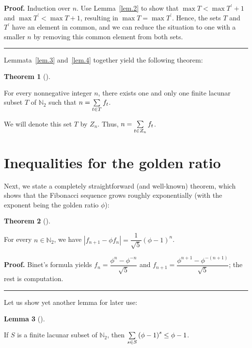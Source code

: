 \documentclass[numbers=enddot,12pt,final,onecolumn,notitlepage]{scrartcl}%
\numberwithin{exer}{section}
\theoremstyle{definition}
\newtheorem{theo}{Theorem}[section]
\newenvironment{theorem}[1][]
{\begin{theo}[#1]\begin{leftbar}}
{\end{leftbar}\end{theo}}
\newtheorem{lem}[theo]{Lemma}
\newenvironment{lemma}[1][]
{\begin{lem}[#1]\begin{leftbar}}
{\end{leftbar}\end{lem}}
\newenvironment{proof}[1][Proof]{\noindent\textbf{#1.} }{\ \rule{0.5em}{0.5em}}
\let\sumnonlimits\sum
\renewcommand{\sum}{\sumnonlimits\limits}
\begin{document}
\begin{proof}
Induction over $n$. Use Lemma~\ref{lem.2} to show that $\max T<\max T^{\prime
}+1$ and $\max T^{\prime}<\max T+1$, resulting in $\max T=\max T^{\prime}$.
Hence, the sets $T$ and $T^{\prime}$ have an element in common, and we can
reduce the situation to one with a smaller $n$ by removing this common element
from both sets.
\end{proof}

Lemmata~\ref{lem.3} and~\ref{lem.4} together yield the following theorem:

\begin{theorem}
[Zeckendorf theorem]\label{thm.5} For every nonnegative integer $n$, there
exists one and only one finite lacunar subset $T$ of $\mathbb{N}_{2}$ such
that $n=\sum\limits_{t\in T}f_{t}$.

We will denote this set $T$ by $Z_{n}$. Thus, $n=\sum\limits_{t\in Z_{n}}%
f_{t}$.
\end{theorem}

\section{Inequalities for the golden ratio}

Next, we state a completely straightforward (and well-known) theorem, which
shows that the Fibonacci sequence grows roughly exponentially (with the
exponent being the golden ratio $\phi$):

\begin{theorem}
\label{thm.6} For every $n\in\mathbb{N}_{2}$, we have $\left\vert f_{n+1}-\phi
f_{n}\right\vert =\dfrac{1}{\sqrt{5}}\left(  \phi-1\right)  ^{n}$.
\end{theorem}

\begin{proof}
Binet's formula yields $f_{n}=\dfrac{\phi^{n}-\phi^{-n}}{\sqrt{5}}$ and
$f_{n+1}=\dfrac{\phi^{n+1}-\phi^{-\left(  n+1\right)  }}{\sqrt{5}}$; the rest
is computation.
\end{proof}

Let us show yet another lemma for later use:

\begin{lemma}
\label{lem.7} If $S$ is a finite lacunar subset of $\mathbb{N}_{2}$, then
$\sum\limits_{s\in S}\left(  \phi-1\right)  ^{s}\leq\phi-1$.
\end{lemma}
\end{document}
